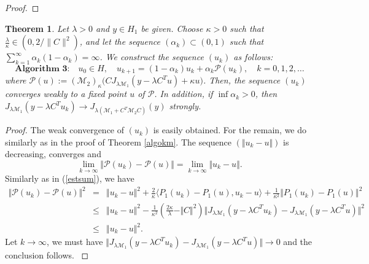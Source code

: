 \documentclass[11pt]{article}
\def\baq{\begin{eqnarray}}
\def\eaq{\end{eqnarray}}
\theoremstyle{plain}
\newtheorem{theorem}{Theorem}
\begin{document}
{\begin{proof}
\end{proof}
{
\begin{theorem}\label{algokm2}
Let $\lambda > 0$ and $y \in H_1$ be given. Choose $\kappa > 0$ such that $\frac{\lambda}{\kappa} \in (0, 2/\|C\|^2)$, and let the sequence $(\alpha_k) \subset (0,1)$ such that $\sum_{k=1}^\infty \alpha_k(1 - \alpha_k) = \infty$. We construct the sequence $(u_k)$ as follows:
\begin{equation*}
\textbf{Algorithm 3:} \quad u_0 \in H, \quad u_{k+1} = (1 - \alpha_k)u_k + \alpha_k\mathcal{P}(u_k), \quad k = 0, 1, 2, \ldots
\end{equation*}
where $\mathcal{P}(u) := (\mathcal{M}_2)_\kappa \Big(C J_{\lambda \mathcal{M}_1}(y - \lambda C^T u) + \kappa u\Big)$.
Then, the sequence $(u_k)$ converges weakly to a fixed point $u$ of $\mathcal{P}$. In addition, if  $\inf \alpha_k > 0$, then $J_{\lambda \mathcal{M}_1}(y - \lambda C^T u_k)\to J_{\lambda (\mathcal{M}_1 + C^T \mathcal{M}_2 C)} (y)$ strongly.
\end{theorem}
}
\begin{proof}
{The weak convergence of $(u_k)$ is easily obtained. For the remain, we do similarly as in the proof of Theorem \ref{algokm}. The sequence $( \Vert u_{k}-u\Vert)$ is decreasing, converges and 
$$ \lim_{k\to \infty}\Vert \mathcal{P}(u_k)-\mathcal{P}(u)\Vert= \lim_{k\to \infty} \Vert u_{k}-u\Vert.$$
Similarly as in (\ref{estsum}), we have 
\baq\nonumber
\Vert \mathcal{P}(u_k)-\mathcal{P}(u)\Vert^2&=&\Vert u_k-u \Vert^2+\frac{2}{\kappa} \langle P_1(u_k)-P_1(u), u_k-u \rangle+\frac{1}{\kappa^2}\Vert P_1(u_k)-P_1(u)\Vert^2\\\nonumber
&\le&\Vert u_k-u \Vert^2-\frac{1}{\kappa^2}(\frac{2\kappa}{\lambda}-\Vert C\Vert^2) \Vert J_{\lambda\mathcal{M}_1}(y-\lambda C^Tu_k)-J_{\lambda\mathcal{M}_1}(y-\lambda C^Tu)\Vert^2\\
&\le&\Vert u_k-u \Vert^2.
\label{estm}
\eaq
Let $k\to\infty$, we must have $ \Vert J_{\lambda\mathcal{M}_1}(y-\lambda C^Tu_k)-J_{\lambda\mathcal{M}_1}(y-\lambda C^Tu)\Vert\to 0$ and the conclusion follows. }
\end{proof}

}
\end{document}
